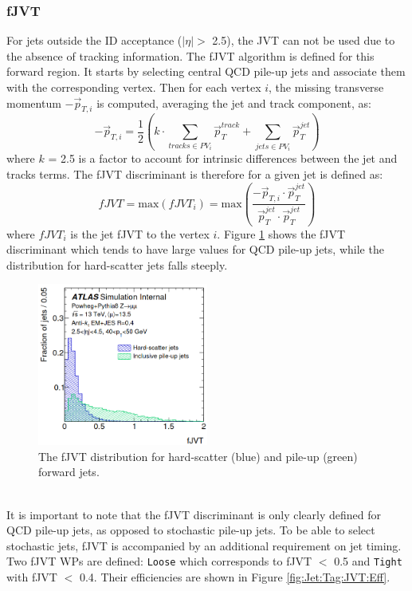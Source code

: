 \subsubsection{fJVT}
\label{Jet:Tag:JVT:fJVT}
For jets outside the ID acceptance ($|\eta|>$ 2.5), the JVT can not be used due to the absence of tracking information. The fJVT algorithm is defined for this forward region. It starts by selecting central QCD pile-up jets and associate them with the corresponding vertex. Then for each vertex $i$, the missing transverse momentum $-\vec{p}_{T, i}$ is computed, averaging the jet and track component, as:
\begin{equation}
    -\vec{p}_{T, i}=\frac{1}{2}\left(k \cdot \sum_{tracks \in P V_{i}} \vec{p}_{T}^{track }+\sum_{jets \in PV_{i}} \vec{p}_{T}^{jet}\right)
\end{equation}
where $k$ = 2.5 is a factor to account for intrinsic differences between the jet and tracks terms. The fJVT discriminant is therefore for a given jet is defined as:
\begin{equation}
    fJVT = \text{max}(fJVT_i) = \text{max}(\frac{-\vec{p}_{T, i} \cdot \vec{p}_{T}^{j e t}}{\vec{p}_{T}^{j e t} \cdot \vec{p}_{T}^{j e t}})
\end{equation}
where $fJVT_i$ is the jet fJVT to the vertex $i$. Figure \ref{fig:Jet:Tag:JVT:fJVT} shows the fJVT discriminant which tends to have large values for QCD pile-up jets, while the distribution for hard-scatter jets falls steeply.
\begin{figure}[htbp]
    \centering
    \includegraphics[width=0.5\textwidth]{Ch4/Img/fJVT.png}
    \caption{The fJVT distribution for hard-scatter (blue) and pile-up (green) forward jets.}
    \label{fig:Jet:Tag:JVT:fJVT}
\end{figure}
\\
It is important to note that the fJVT discriminant is only clearly defined for QCD pile-up jets, as opposed to stochastic pile-up jets. To be able to select stochastic jets, fJVT is accompanied by an additional requirement on jet timing. Two fJVT WPs are defined: \texttt{Loose} which corresponds to fJVT $<$ 0.5 and \texttt{Tight} with fJVT $<$ 0.4. Their efficiencies are shown in Figure \ref{fig:Jet:Tag:JVT:Eff}.

